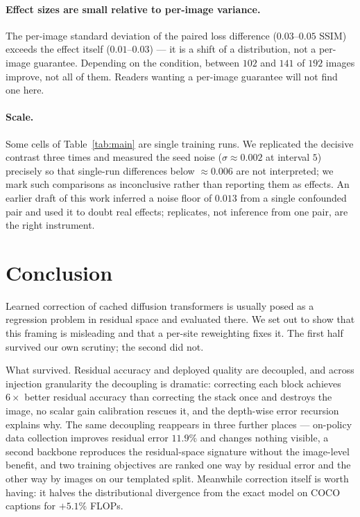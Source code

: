 \paragraph{Effect sizes are small relative to per-image variance.} The per-image
standard deviation of the paired loss difference ($0.03$--$0.05$ SSIM) exceeds the
effect itself ($0.01$--$0.03$) --- it is a shift of a distribution, not a per-image
guarantee. Depending on the condition, between $102$ and $141$ of $192$ images improve,
not all of them. Readers wanting a per-image guarantee will not find one here.

\paragraph{Scale.} Some cells of Table~\ref{tab:main} are single training runs. We
replicated the decisive contrast three times and measured the seed noise
($\sigma \approx 0.002$ at interval $5$) precisely so that single-run differences
below $\approx\!0.006$ are not interpreted; we mark such comparisons as
inconclusive rather than reporting them as effects. An earlier draft of this work
inferred a noise floor of $0.013$ from a single confounded pair and used it to doubt
real effects; replicates, not inference from one pair, are the right instrument.

\section{Conclusion}

Learned correction of cached diffusion transformers is usually posed as a regression
problem in residual space and evaluated there. We set out to show that this framing is
misleading and that a per-site reweighting fixes it. The first half survived our own
scrutiny; the second did not.

What survived. Residual accuracy and deployed quality are decoupled, and across
injection granularity the decoupling is dramatic: correcting each block achieves
$6\times$ better residual accuracy than correcting the stack once and destroys the
image, no scalar gain calibration rescues it, and the depth-wise error recursion
explains why. The same decoupling reappears in three further places --- on-policy data
collection improves residual error $11.9\%$ and changes nothing visible, a second
backbone reproduces the residual-space signature without the image-level benefit, and
two training objectives are ranked one way by residual error and the other way by images
on our templated split. Meanwhile correction itself is worth having: it halves the
distributional divergence from the exact model on COCO captions for $+5.1\%$ FLOPs.

